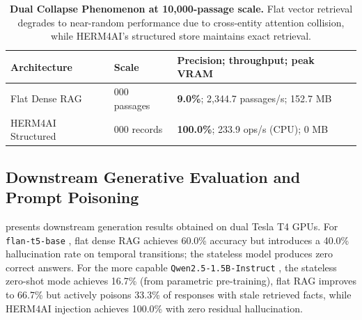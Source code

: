 \documentclass[11pt,a4paper,twocolumn]{article}
\newcommand{\herm}{\textsc{HERM4AI}}
\begin{document}
\begin{table}[h]
\centering
\footnotesize
\setlength{\tabcolsep}{4pt}
\begin{tabularx}{\columnwidth}{
  >{\raggedright\arraybackslash}p{2.0cm}
  >{\raggedright\arraybackslash}p{1.4cm}
  >{\raggedright\arraybackslash}X}
\toprule
\textbf{Architecture} & \textbf{Scale} & \textbf{Precision; throughput; peak VRAM} \\
\midrule
Flat Dense RAG & 10{,}000 passages & \textbf{9.0\%}; 2{,}344.7 passages/s; 152.7 MB \\
\herm{} Structured & 10{,}000 records & \textbf{100.0\%}; 233.9 ops/s (CPU); 0 MB \\
\bottomrule
\end{tabularx}
\caption{\textbf{Dual Collapse Phenomenon at 10{,}000-passage scale.}
Flat vector retrieval degrades to near-random performance due to
cross-entity attention collision, while \herm{}'s structured store
maintains exact retrieval.}
\label{tab:dual_collapse}
\end{table}

\subsection{Downstream Generative Evaluation and Prompt Poisoning}
\label{sec:results_gen}

 presents downstream generation results
obtained on dual Tesla T4 GPUs.  For \texttt{flan-t5-base}
\citep{chung2022flan}, flat dense RAG achieves 60.0\% accuracy but
introduces a 40.0\% hallucination rate on temporal transitions; the
stateless model produces zero correct answers.  For the more capable
\texttt{Qwen2.5-1.5B-Instruct} \citep{qwen2024}, the stateless
zero-shot mode achieves 16.7\% (from parametric pre-training), flat
RAG improves to 66.7\% but actively poisons 33.3\% of responses with
stale retrieved facts, while \herm{} injection achieves 100.0\% with
zero residual hallucination.
\end{document}
